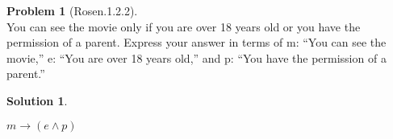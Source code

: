 \documentclass{article}
\theoremstyle{definition}
\newtheorem*{problem}{Problem}
\newtheorem*{solution}{Solution}
\begin{document}
\begin{problem}[Rosen.1.2.2]\ \\
You can see the movie only if you are over 18 years old
or you have the permission of a parent. Express your answer
in terms of m: “You can see the movie,” e: “You are
over 18 years old,” and p: “You have the permission of a
parent.”
\begin{compactenum}
\renewcommand{\theenumi}{\alph{enumi}}

\end{compactenum}
\end{problem}

\begin{solution}\ \\
\begin{compactenum}
\renewcommand{\theenumi}{\alph{enumi}}
$m \rightarrow ( e \wedge p)$
\end{compactenum}
\end{solution}
\end{document}

